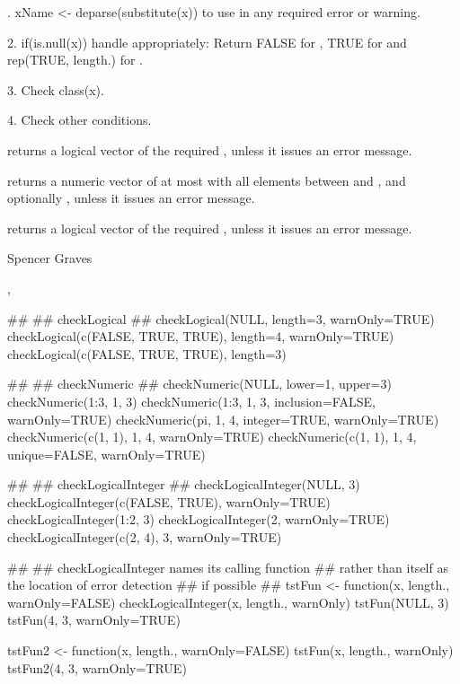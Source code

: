 \documentclass{article}
\begin{document}
\begin{Details}.  xName <- deparse(substitute(x)) to use in any required error or
warning.  

2.  if(is.null(x)) handle appropriately:  Return FALSE for
, TRUE for  and rep(TRUE,
length.) for .  

3.  Check class(x).

4.  Check other conditions.
\end{Details}
\begin{Value}
 returns a logical vector of the required
, unless it issues an error message.

 returns a numeric vector of at most 
with all elements between  and , and
optionally , unless it issues an error message.

 returns a logical vector of the required
, unless it issues an error message.
\end{Value}
\begin{Author}\relax
Spencer Graves
\end{Author}
\begin{SeeAlso}\relax
{},
\end{SeeAlso}
\begin{Examples}
\begin{ExampleCode}
##
## checkLogical
##
checkLogical(NULL, length=3, warnOnly=TRUE)
checkLogical(c(FALSE, TRUE, TRUE), length=4, warnOnly=TRUE)
checkLogical(c(FALSE, TRUE, TRUE), length=3)

##
## checkNumeric
##
checkNumeric(NULL, lower=1, upper=3)
checkNumeric(1:3, 1, 3)
checkNumeric(1:3, 1, 3, inclusion=FALSE, warnOnly=TRUE)
checkNumeric(pi, 1, 4, integer=TRUE, warnOnly=TRUE)
checkNumeric(c(1, 1), 1, 4, warnOnly=TRUE)
checkNumeric(c(1, 1), 1, 4, unique=FALSE, warnOnly=TRUE)

##
## checkLogicalInteger
##
checkLogicalInteger(NULL, 3)
checkLogicalInteger(c(FALSE, TRUE), warnOnly=TRUE) 
checkLogicalInteger(1:2, 3) 
checkLogicalInteger(2, warnOnly=TRUE) 
checkLogicalInteger(c(2, 4), 3, warnOnly=TRUE)

##
## checkLogicalInteger names its calling function 
## rather than itself as the location of error detection
## if possible
##
tstFun <- function(x, length., warnOnly=FALSE){
   checkLogicalInteger(x, length., warnOnly) 
}
tstFun(NULL, 3)
tstFun(4, 3, warnOnly=TRUE)

tstFun2 <- function(x, length., warnOnly=FALSE){
   tstFun(x, length., warnOnly)
}
tstFun2(4, 3, warnOnly=TRUE)

\end{ExampleCode}
\end{Examples}
\end{document}
